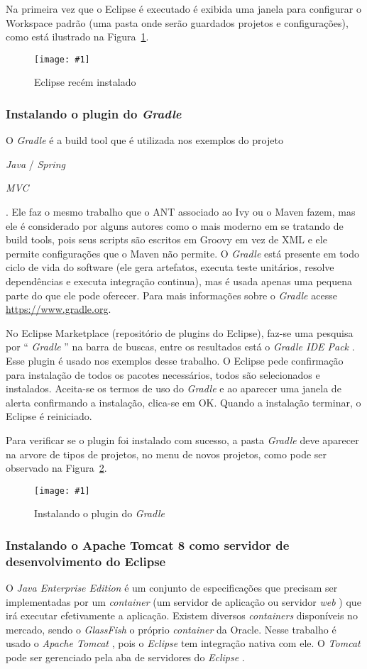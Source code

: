 \documentclass[a4paper,12pt]{article}
\newcommand{\spring} {
\lang{Java}/\est{Spring} \sigla{MVC}
}
\newcommand{\figura}[3] {
	\begin{figure}[ht]
		\centering
		\texttt{[image: \#1]}
		\caption{#2}
		\label{#3}
	\end{figure}
	\FloatBarrier
}
\newcommand{\est}[1] {
	\textit{#1}
}
\newcommand{\sigla}[1] {
	\textit{#1}
}
\newcommand{\lang}[1] {
	\textit{#1}
}
\begin{document}
Na primeira vez que o Eclipse é executado é exibida uma janela para configurar o Workspace padrão (uma pasta onde serão guardados projetos e configurações), como está ilustrado na Figura~\ref{fig:eclipse1}.

\figura{eclipse1.png}{Eclipse recém instalado}{fig:eclipse1}

\subsubsection{Instalando o plugin do \est{Gradle}} 

O \est{Gradle} é a build tool que é utilizada nos exemplos do projeto \spring. Ele faz o mesmo trabalho que o ANT associado ao Ivy ou o Maven fazem, mas ele é considerado por alguns autores como o mais moderno em se tratando de build tools, pois seus scripts são escritos em Groovy em vez de XML e ele permite configurações que o Maven não permite. O \est{Gradle} está presente em todo ciclo de vida do software (ele gera artefatos, executa teste unitários, resolve dependências e executa integração continua), mas é usada apenas uma pequena parte do que ele pode oferecer. Para mais informações sobre o \est{Gradle} acesse \url{https://www.gradle.org}. 

No Eclipse Marketplace (repositório de plugins do Eclipse), faz-se uma pesquisa por “\est{Gradle}” na barra de buscas, entre os resultados está o \est{Gradle IDE Pack}. Esse plugin é usado nos exemplos desse trabalho. O Eclipse pede confirmação para instalação de todos os pacotes necessários, todos são selecionados e instalados. Aceita-se os termos de uso do \est{Gradle} e ao aparecer uma janela de alerta confirmando a instalação, clica-se em OK. Quando a instalação terminar, o Eclipse é reiniciado.

Para verificar se o plugin foi instalado com sucesso, a pasta \est{Gradle} deve aparecer na arvore de tipos de projetos, no menu de novos projetos, como pode ser observado na Figura~\ref{fig:gradle1}.

\figura{plugin1.png}{Instalando o plugin do \est{Gradle}}{fig:gradle1}

\subsubsection{Instalando o Apache Tomcat 8 como servidor de desenvolvimento do Eclipse} 

O \est{Java Enterprise Edition} é um conjunto de especificações que precisam ser implementadas por um \est{container} (um servidor de aplicação ou servidor \est{web}) que irá executar efetivamente a aplicação. Existem diversos \est{containers} disponíveis no mercado, sendo o \est{GlassFish} o próprio \est{container} da Oracle. Nesse trabalho é usado o \est{Apache Tomcat}, pois o \est{Eclipse} tem integração nativa com ele. O \est{Tomcat} pode ser gerenciado pela aba de servidores do \est{Eclipse}.
\end{document}
